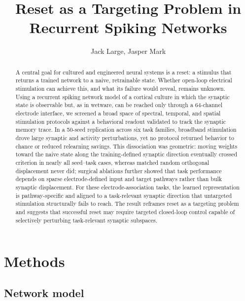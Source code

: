 \documentclass{article}
\title{Reset as a Targeting Problem in Recurrent Spiking Networks}
\author{Jack Large, Jasper Mark}
\begin{document}
\maketitle

\begin{abstract}
  A central goal for cultured and engineered neural systems is a reset: a stimulus that returns a trained network to a naive, retrainable state. Whether open-loop electrical stimulation can achieve this, and what its failure would reveal, remains unknown. Using a recurrent spiking network model of a cortical culture in which the synaptic state is observable but, as in wetware, can be reached only through a 64-channel electrode interface, we screened a broad space of spectral, temporal, and spatial stimulation protocols against a behavioral readout validated to track the synaptic memory trace. In a 50-seed replication across six task families, broadband stimulation drove large synaptic and activity perturbations, yet no protocol returned behavior to chance or reduced relearning savings. This dissociation was geometric: moving weights toward the naive state along the training-defined synaptic direction eventually crossed criterion in nearly all seed--task cases, whereas matched random orthogonal displacement never did; surgical ablations further showed that task performance depends on sparse electrode-defined input and target pathways rather than bulk synaptic displacement. For these electrode-association tasks, the learned representation is pathway-specific and aligned to a task-relevant synaptic direction that untargeted stimulation structurally fails to reach. The result reframes reset as a targeting problem and suggests that successful reset may require targeted closed-loop control capable of selectively perturbing task-relevant synaptic subspaces.
\end{abstract}

\section{Methods}

\subsection{Network model}
\end{document}
